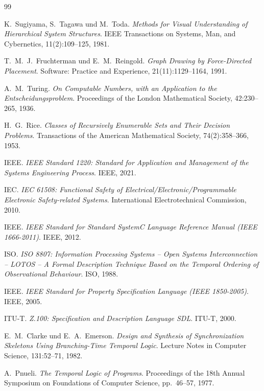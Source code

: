 ﻿\documentclass[a4paper,12pt]{article}
\theoremstyle{definition}
\begin{document}
\begin{thebibliography}{99}

K.~Sugiyama, S.~Tagawa und M.~Toda.
\textit{Methods for Visual Understanding of Hierarchical System Structures}.
IEEE Transactions on Systems, Man, and Cybernetics, 11(2):109--125, 1981.

T.~M.~J.~Fruchterman und E.~M.~Reingold.
\textit{Graph Drawing by Force-Directed Placement}.
Software: Practice and Experience, 21(11):1129--1164, 1991.

A.~M.~Turing.
\textit{On Computable Numbers, with an Application to the Entscheidungsproblem}.
Proceedings of the London Mathematical Society, 42:230--265, 1936.

H.~G.~Rice.
\textit{Classes of Recursively Enumerable Sets and Their Decision Problems}.
Transactions of the American Mathematical Society, 74(2):358--366, 1953.

IEEE.
\textit{IEEE Standard 1220: Standard for Application and Management of the
Systems Engineering Process}.
IEEE, 2021.

IEC.
\textit{IEC 61508: Functional Safety of Electrical/Electronic/Programmable Electronic
Safety-related Systems}.
International Electrotechnical Commission, 2010.

IEEE.
\textit{IEEE Standard for Standard SystemC Language Reference Manual (IEEE 1666-2011)}.
IEEE, 2012.

ISO.
\textit{ISO 8807: Information Processing Systems -- Open Systems Interconnection --
LOTOS -- A Formal Description Technique Based on the Temporal Ordering of
Observational Behaviour}.
ISO, 1988.

IEEE.
\textit{IEEE Standard for Property Specification Language (IEEE 1850-2005)}.
IEEE, 2005.

ITU-T.
\textit{Z.100: Specification and Description Language SDL}.
ITU-T, 2000.

E.~M.~Clarke und E.~A.~Emerson.
\textit{Design and Synthesis of Synchronization Skeletons Using Branching-Time
Temporal Logic}.
Lecture Notes in Computer Science, 131:52--71, 1982.

A.~Pnueli.
\textit{The Temporal Logic of Programs}.
Proceedings of the 18th Annual Symposium on Foundations of Computer Science,
pp.~46--57, 1977.


\end{thebibliography}
\end{document}
